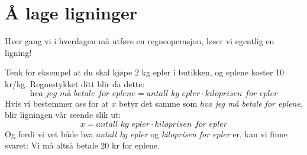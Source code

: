 



\section{Å lage ligninger}
Hver gang vi i hverdagen må utføre en regneoperasjon, løser vi egentlig en ligning! \vsk

Tenk for eksempel at du skal kjøpe 2 kg epler i butikken, og eplene koster 10 kr/kg. Regnestykket ditt blir da dette:
\small
\[ \textit{hva jeg må betale for eplene}=\textit{antall kg epler}\cdot \textit{kiloprisen for epler} \]
\normalsize
Hvis vi bestemmer oss for at $ x $ betyr det samme som \textit{hva jeg må betale for eplene}, blir ligningen vår seende slik ut:
\[ x=\textit{antall kg epler}\cdot \textit{kiloprisen for epler} \]
Og fordi vi vet både hva \textit{antall kg epler} og \textit{kiloprisen for epler} er, kan vi finne svaret:\vs
{}
Vi må altså betale 20 kr for eplene. \vsk 

